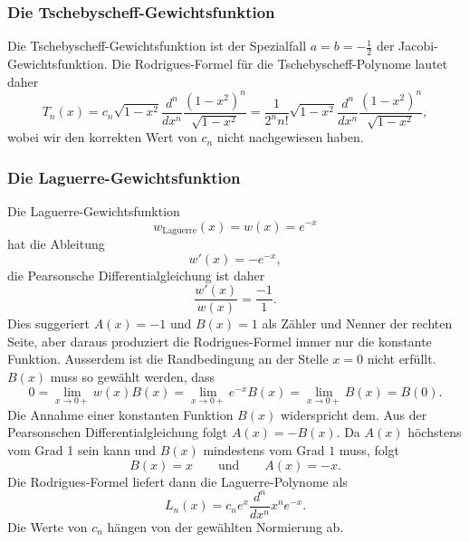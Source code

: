 %
%
\subsubsection{Die Tschebyscheff-Gewichtsfunktion}
Die Tschebyscheff-Gewichtsfunktion ist der Spezialfall $a=b=-\frac12$
der Jacobi-Gewichtsfunktion.
%
%
Die Rodrigues-Formel für die Tschebyscheff-Polynome lautet daher
\[
T_n(x)
=
c_n\sqrt{1-x^2} \frac{d^n}{dx^n}
\frac{(1-x^2)^n}{\sqrt{1-x^2}}
=
\frac{1}{2^nn!} \sqrt{1-x^2}
\frac{d^n}{dx^n} 
\frac{(1-x^2)^n}{\sqrt{1-x^2}},
\]
wobei wir den korrekten Wert von $c_n$ nicht nachgewiesen haben.

%
%
\subsubsection{Die Laguerre-Gewichtsfunktion}
Die Laguerre-Gewichtsfunktion
%
%
\[
w_{\text{Laguerre}}(x)
=
w(x)
=
e^{-x}
\]
hat die Ableitung
\[
w'(x) = -e^{-x},
\]
die Pearsonsche Differentialgleichung ist daher
\[
\frac{w'(x)}{w(x)}=\frac{-1}{1}.
\]
Dies suggeriert $A(x)=-1$ und $B(x)=1$ als Zähler und Nenner der rechten
Seite, aber daraus produziert die Rodrigues-Formel immer nur die konstante
Funktion.
Ausserdem ist die Randbedingung an der Stelle $x=0$ nicht erfüllt.
$B(x)$ muss so gewählt werden, dass
\[
0
=
\lim_{x\to 0+} w(x)B(x)
= 
\lim_{x\to 0+} e^{-x}B(x)
=
\lim_{x\to 0+} B(x)
=
B(0).
\]
Die Annahme einer konstanten Funktion $B(x)$ widerspricht dem.
Aus der Pearsonschen Differentialgleichung folgt $A(x)=-B(x)$.
Da $A(x)$ höchstens vom Grad 1 sein kann und $B(x)$ mindestens
vom Grad $1$ muss, folgt
\[
B(x) = x
\qquad\text{und}\qquad
A(x) = -x.
\]
Die Rodrigues-Formel liefert dann die Laguerre-Polynome als
\[
L_n(x) = c_n e^x \frac{d^n}{dx^n} x^ne^{-x}.
\]
Die Werte von $c_n$ hängen von der gewählten Normierung ab.


